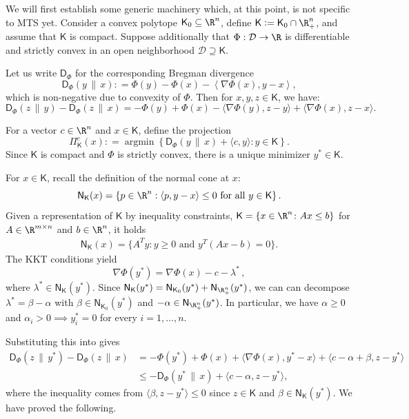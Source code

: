\documentclass{toc}
\newcommand{\calD}{\mathcal D}
\newcommand{\dmid}{\,\|\,}
\newcommand{\seteq}{\mathrel{\mathop:}=}
\newcommand{\sfD}{\mathsf D}
\newcommand{\sfK}{\mathsf K}
\newcommand{\sfN}{\mathsf N}
\newcommand{\llangle}{\left\langle}
\newcommand{\rrangle}{\right\rangle}
\DeclareMathOperator{\argmin}{\mathrm{argmin}}
\begin{document}
We will first establish some generic machinery which, at this point, is not specific to MTS yet. Consider a convex polytope 
$\sfK_0\subseteq \R^n$, define $\sfK \seteq \sfK_0 \cap \R_+^n$, and assume that $\sfK$ is compact.
Suppose additionally that $\Phi : \calD \to \R$
is differentiable and strictly convex in an open neighborhood $\calD\supseteq \sfK$.

Let us write $\sfD_{\Phi}$ for the corresponding Bregman divergence
\[
\sfD_{\Phi}(y \dmid x) \seteq \Phi(y) - \Phi(x) - \llangle \nabla \Phi(x), y-x\rrangle,
\]
which is non-negative due to convexity of $\Phi$.
Then for $x,y,z \in \sfK$, we have:
\begin{equation}\label{eq:s1}
\sfD_{\Phi}(z \dmid y) - \sfD_{\Phi}(z \dmid x) = -\Phi(y)+\Phi(x)-\langle \nabla \Phi(y), z-y\rangle+\langle \nabla \Phi(x),z-x\rangle.
\end{equation}

For a vector $c \in \R^n$ and $x \in \sfK$, define the projection
\[
\Pi_{\sfK}^c (x) \seteq \argmin \left\{ \sfD_{\Phi}(y \dmid x) + \langle c,y\rangle : y \in \sfK \right\}.
\]
Since $\sfK$ is compact and $\Phi$ is strictly convex, there is a unique minimizer $y^* \in \sfK$.

For $x \in \sfK$, recall the definition of the normal cone at $x$:
\[\sfN_{\sfK}(x) = \left\{ p \in \R^n : \langle p, y-x\rangle \leq 0 \textrm{ for all } y \in \sfK \right\}.\]
Given a representation of $\sfK$ by inequality constraints, $\sfK=\{x\in\R^n\colon Ax\le b\}$ for $A\in\R^{m\times n}$ and $b\in\R^n$, it holds
\begin{align*}
\sfN_{\sfK}(x) = \{A^Ty\colon y\ge0\text{ and }y^T(Ax-b)=0\}.
\end{align*}
The KKT conditions yield
\begin{equation}\label{eq:KKT}
\nabla \Phi(y^*) = \nabla \Phi(x) - c - \lambda^*\,,
\end{equation}
where $\lambda^* \in \sfN_{\sfK}(y^*)$.
Since $\sfN_{\sfK}(y^*) = \sfN_{\sfK_0}(y^*) + \sfN_{\R_+^n}(y^*)$, we can
can decompose $\lambda^* = \beta - \alpha$ 
with $\beta \in \sfN_{\sfK_0}(y^*)$ and $- \alpha \in \sfN_{\R_+^n}(y^*)$.
In particular, we have $\alpha \geq 0$ and
$\alpha_i > 0 \implies y^*_i = 0$ for every $i=1,\ldots,n$.

Substituting this into  gives
\begin{align*}
\sfD_{\Phi}(z \dmid y^*) - \sfD_{\Phi}(z \dmid x) &= -\Phi(y^*)+\Phi(x)+\langle \nabla \Phi(x),y^*-x\rangle +
\langle c-\alpha + \beta, z-y^* \rangle \\
&\leq -\sfD_{\Phi}(y^* \dmid x) + \langle c-\alpha, z-y^*\rangle,
\end{align*}
where the inequality comes from $\langle \beta, z-y^*\rangle \leq 0$ since $z \in \sfK$ and $\beta \in \sfN_{\sfK}(y^*)$.
We have proved the following.
\end{document}
